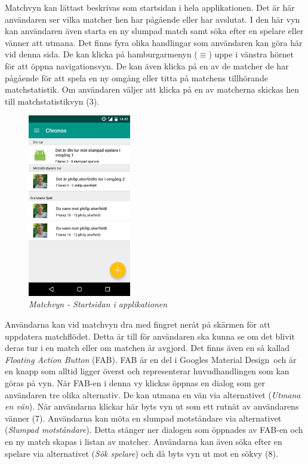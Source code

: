\documentclass[a4paper, 11pt]{article}
\begin{document}
Matchvyn kan lättast beskrivas som startsidan i hela applikationen. Det är här användaren ser vilka matcher hen har pågående eller har avslutat. I den här vyn kan användaren även starta en ny slumpad match samt söka efter en spelare eller vänner att utmana. 
Det finns fyra olika handlingar som användaren kan göra här vid denna sida. De kan klicka på hamburgarmenyn ($\equiv$) uppe i vänstra hörnet för att öppna navigationsvyn. De kan även klicka på en av de matcher de har pågående för att spela en ny omgång eller titta på matchens tillhörande matchstatistik. Om användaren väljer att klicka på en av matcherna skickas hen till matchstatistikvyn (3).
\begin{figure}[H]
\begin{center}
	\includegraphics[width=0.4\textwidth]{app_matches} 
	\caption{\textit{Matchvyn - Startsidan i applikationen}}
	\end{center}
\end{figure}
\pagebreak

Användarna kan vid matchvyn dra med fingret neråt på skärmen för att uppdatera matchflödet. Detta är till för användaren ska kunna se om det blivit deras tur i en match eller om matchen är avgjord. Det finns även en så kallad \textit{Floating Action Button} (FAB). FAB är en del i Googles Material Design~\cite{MaterialDesign}och är en knapp som alltid ligger överst och representerar huvudhandlingen som kan göras på vyn. När FAB-en i denna vy klickas öppnas en dialog som ger användaren tre olika alternativ. De kan utmana en vän via alternativet (\textit{Utmana en vän}). När användarna klickar här byts vyn ut som ett rutnät av användarens vänner (7). 
Användarna kan möta en slumpad motståndare via alternativet (\textit{Slumpad motståndare}). Detta stänger ner dialogen som öppnades av FAB-en och en ny match skapas i listan av matcher. Användarna kan även söka efter en spelare via alternativet (\textit{Sök spelare}) och då byts vyn ut mot en sökvy (8). 
\end{document}
